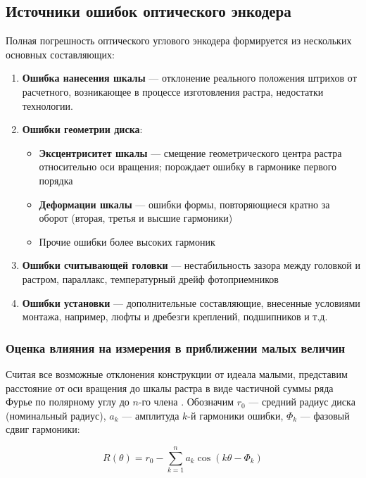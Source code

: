 \subsection{Источники ошибок оптического энкодера} \label{subsec:error_source}

Полная погрешность оптического углового энкодера формируется из нескольких основных составляющих:

\begin{enumerate}
\item \textbf{Ошибка нанесения шкалы} --- отклонение реального положения штрихов от расчетного, возникающее в процессе изготовления растра, недостатки технологии.
\item\textbf{Ошибки геометрии диска}:
\begin{itemize}
    \item \textbf{Эксцентриситет шкалы} --- смещение геометрического центра растра относительно оси вращения; порождает ошибку в гармонике первого порядка
    \item \textbf{Деформации шкалы} --- ошибки формы, повторяющиеся кратно за оборот (вторая, третья и высшие гармоники) 
    \item Прочие ошибки более высоких гармоник
\end{itemize}
\item \textbf{Ошибки считывающей головки} --- нестабильность зазора между головкой и растром, параллакс, температурный дрейф фотоприемников
\item \textbf{Ошибки установки} --- дополнительные составляющие, внесенные условиями монтажа, например, люфты и дребезги креплений, подшипников и т.д. 
\end{enumerate}

\subsubsection{Оценка влияния на измерения в приближении малых величин}

Считая все возможные отклонения конструкции от идеала малыми, представим расстояние от оси вращения до шкалы растра в виде частичной суммы ряда Фурье по полярному углу до $n$-го члена \cite{renishaw_encoder_accuracy}. Обозначим $r_0$ --- средний радиус диска (номинальный радиус), $a_k$ --- амплитуда $k$-й гармоники ошибки, $\Phi_k$ --- фазовый сдвиг гармоники:

\begin{equation*}
    R(\theta) = r_0 - \sum_{k=1}^{n}a_k\cos(k\theta-\Phi_k)
\end{equation*}

